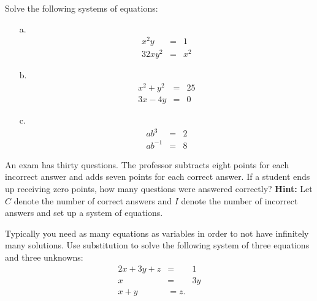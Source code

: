 \begin{question} Solve the following systems of equations:
\begin{enumerate}
\item[a.]
\begin{eqnarray*}
x^2y & = & 1\\
32xy^2 & = & x^2
\end{eqnarray*}

 
\item[b.]
\begin{eqnarray*}
x^2+y^2 & = & 25\\
3x-4y & = & 0
\end{eqnarray*}

\item[c.] 
\begin{eqnarray*}
ab^3 & = & 2\\
ab^{-1} & = & 8
\end{eqnarray*}
\end{enumerate}
\par
\end{question}
 
\begin{question} An exam has thirty questions. The professor subtracts eight points for each incorrect answer and adds seven points for each correct answer. If a student ends up receiving zero points, how many questions were answered correctly? {\bf Hint:} Let $C$ denote the number of correct answers and $I$ denote the number of incorrect answers and set up a system of equations. 
\end{question} 
 
\begin{question} Typically you need as many equations as variables in order to not have infinitely many solutions. Use substitution to solve the following system of three equations and three unknowns:
\begin{eqnarray*}
2x+3y +z & = & 1\\
x & = & 3y\\
x+y & = z.
\end{eqnarray*} 
\end{question}

\par 

